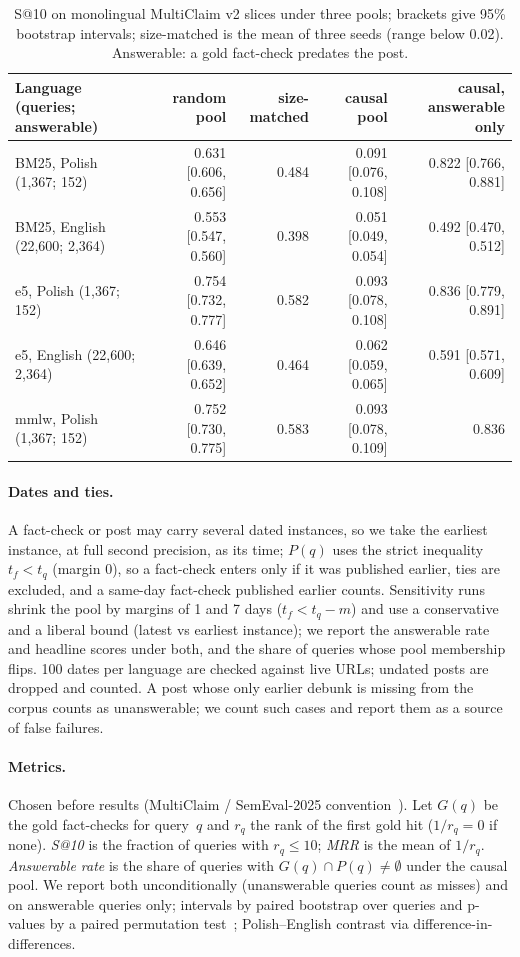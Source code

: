 \documentclass[11pt]{article}
\begin{document}
\begin{table}[!t]
\centering
\caption{S@10 on monolingual MultiClaim v2 slices under three pools; brackets give 95\% bootstrap intervals; size-matched is the mean of three seeds (range below 0.02). Answerable: a gold fact-check predates the post.}
\label{tab:poc}
\small
\begin{tabular}{@{}lrrrr@{}}
\toprule
Language (queries; answerable) & random pool & size-matched & causal pool & causal, answerable only \\
\midrule
BM25, Polish (1,367; 152) & 0.631 [0.606, 0.656] & 0.484 & 0.091 [0.076, 0.108] & 0.822 [0.766, 0.881] \\
BM25, English (22,600; 2,364) & 0.553 [0.547, 0.560] & 0.398 & 0.051 [0.049, 0.054] & 0.492 [0.470, 0.512] \\
e5, Polish (1,367; 152) & 0.754 [0.732, 0.777] & 0.582 & 0.093 [0.078, 0.108] & 0.836 [0.779, 0.891] \\
e5, English (22,600; 2,364) & 0.646 [0.639, 0.652] & 0.464 & 0.062 [0.059, 0.065] & 0.591 [0.571, 0.609] \\
mmlw, Polish (1,367; 152) & 0.752 [0.730, 0.775] & 0.583 & 0.093 [0.078, 0.109] & 0.836 \\
\bottomrule
\end{tabular}
\end{table}

\paragraph{Dates and ties.}
A fact-check or post may carry several dated instances, so we take the earliest instance, at full second precision, as its time; $P(q)$ uses the strict inequality $t_f<t_q$ (margin 0), so a fact-check enters only if it was published earlier, ties are excluded, and a same-day fact-check published earlier counts.
Sensitivity runs shrink the pool by margins of 1 and 7 days ($t_f<t_q-m$) and use a conservative and a liberal bound (latest vs earliest instance); we report the answerable rate and headline scores under both, and the share of queries whose pool membership flips.
100 dates per language are checked against live URLs; undated posts are dropped and counted.
A post whose only earlier debunk is missing from the corpus counts as unanswerable; we count such cases and report them as a source of false failures.

\paragraph{Metrics.}
Chosen before results (MultiClaim / SemEval-2025 convention~\cite{pikuliak2023multilingual,peng2025semeval}).
Let $G(q)$ be the gold fact-checks for query~$q$ and $r_q$ the rank of the first gold hit ($1/r_q=0$ if none).
\emph{S@10} is the fraction of queries with $r_q\le 10$; \emph{MRR} is the mean of $1/r_q$.
\emph{Answerable rate} is the share of queries with $G(q)\cap P(q)\ne\emptyset$ under the causal pool.
We report both unconditionally (unanswerable queries count as misses) and on answerable queries only; intervals by paired bootstrap over queries and p-values by a paired permutation test~\cite{urbano2019statistical}; Polish--English contrast via difference-in-differences.
\end{document}
